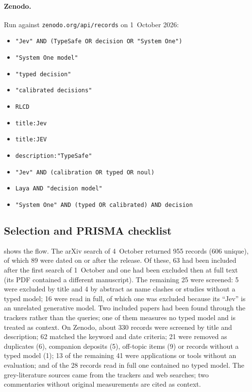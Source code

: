 \paragraph{Zenodo.}
Run against \texttt{zenodo.org/api/records} on 1~October 2026:
\begin{itemize}[nosep,leftmargin=1.5em]
  \item \nolinkurl{"Jev" AND (TypeSafe OR decision OR "System One")}
  \item \nolinkurl{"System One model"}
  \item \nolinkurl{"typed decision"}
  \item \nolinkurl{"calibrated decisions"}
  \item \nolinkurl{RLCD}
  \item \nolinkurl{title:Jev}
  \item \nolinkurl{title:JEV}
  \item \nolinkurl{description:"TypeSafe"}
  \item \nolinkurl{"Jev" AND (calibration OR typed OR noul)}
  \item \nolinkurl{Laya AND "decision model"}
  \item \nolinkurl{"System One" AND (typed OR calibrated) AND decision}
\end{itemize}


\subsection{Selection and PRISMA checklist}
\label{app:prisma}
 shows the flow.
The arXiv search of 4~October returned 955 records (606 unique), of which 89 were dated on or after the release.
Of these, 63 had been included after the first search of 1~October and one had been excluded then at full text (its PDF contained a different manuscript).
The remaining 25 were screened: 5 were excluded by title and 4 by abstract as name clashes or studies without a typed model; 16 were read in full, of which one was excluded because its ``Jev'' is an unrelated generative model.
Two included papers had been found through the trackers rather than the queries; one of them measures no typed model and is treated as context.
On Zenodo, about 330 records were screened by title and description; 62 matched the keyword and date criteria; 21 were removed as duplicates (6), companion deposits (5), off-topic items (9) or records without a typed model (1); 13 of the remaining 41 were applications or tools without an evaluation; and of the 28 records read in full one contained no typed model.
The grey-literature sources came from the trackers and web searches; two commentaries without original measurements are cited as context.


